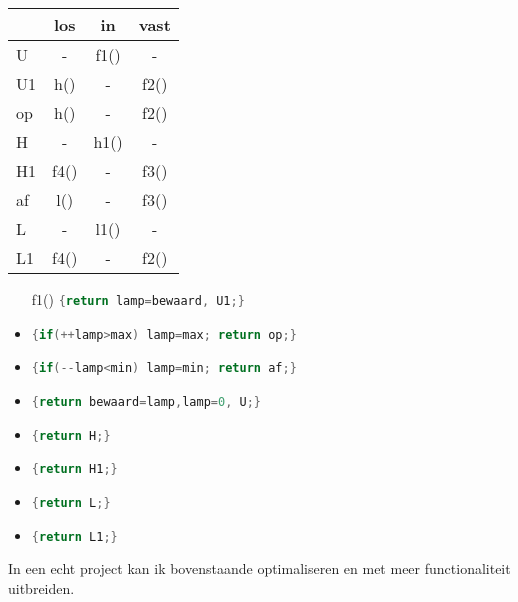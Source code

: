 \documentclass[a4paper, 11pt, fleqn, twoside]{scrartcl}%
\begin{document}
\begin{minipage}{0.35\textwidth}
\hspace{2em}\begin{tabular}{|l|c|c|c|}\hline
   & los  & in   & vast \\ \hline%
 U & -    & f1() &-     \\ %
 U1& h()  & -    & f2() \\ %
 op& h()  & -    & f2() \\ \hline
 H & -    & h1() & -    \\ %
 H1& f4() & -    & f3() \\ %
 af& l()  & -    & f3() \\ \hline
 L & -    & l1() & -    \\ %
 L1& f4() & -    & f2() \\ \hline
\end{tabular}
\end{minipage}
\begin{minipage}{0.6\textwidth}\begin{itemize}
\item[f1()] \lstinline[language=C]${return lamp=bewaard, U1;}$
\item[f2()] \lstinline[language=C]${if(++lamp>max) lamp=max; return op;}$
\item[f3()] \lstinline[language=C]${if(--lamp<min) lamp=min; return af;}$
\item[f4()] \lstinline[language=C]${return bewaard=lamp,lamp=0, U;}$
\item[h()]  \lstinline[language=C]${return H;}$
\item[h1()] \lstinline[language=C]${return H1;}$
\item[l()]  \lstinline[language=C]${return L;}$
\item[l1()] \lstinline[language=C]${return L1;}$
\end{itemize}
\end{minipage}

\vspace{2ex}
In een echt project kan ik bovenstaande optimaliseren en met meer functionaliteit uitbreiden.

\end{document}
